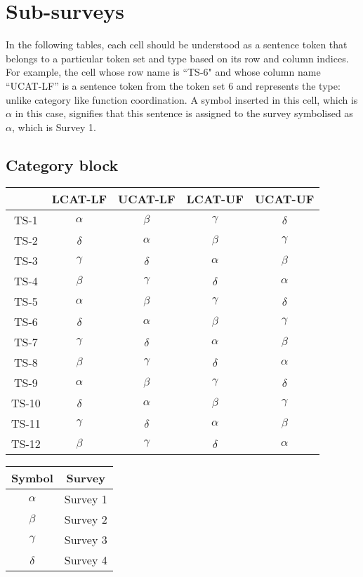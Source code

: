 \section{Sub-surveys} \label{app:subsurveys}

In the following tables, each cell should be understood as a sentence token that belongs to a particular token set and type based on its row and column indices. For example, the cell whose row name is ``TS-6" and whose column name ``UCAT-LF'' is a sentence token from the token set 6 and represents the type: unlike category like function coordination. A symbol inserted in this cell, which is $\alpha$ in this case, signifies that this sentence is assigned to the survey symbolised as $\alpha$, which is Survey 1. 

\subsection{Category block}

\begin{tabular}{|c|c|c|c|c|}
	\hline
	 & \textbf{LCAT-LF} & \textbf{UCAT-LF} & \textbf{LCAT-UF} & \textbf{UCAT-UF} \\ \hline
	TS-1 & $\alpha$ & $\beta$ & $\gamma$ & $\delta$ \\ \hline
	TS-2 & $\delta$ & $\alpha$ & $\beta$ & $\gamma$ \\ \hline
	TS-3 & $\gamma$ & $\delta$ & $\alpha$ & $\beta$ \\ \hline
	TS-4 & $\beta$ & $\gamma$ & $\delta$ & $\alpha$ \\ \hline
	TS-5 & $\alpha$ & $\beta$ & $\gamma$ & $\delta$ \\ \hline
	TS-6 & $\delta$ & $\alpha$ & $\beta$ & $\gamma$ \\ \hline
	TS-7 & $\gamma$ & $\delta$ & $\alpha$ & $\beta$ \\ \hline
	TS-8 & $\beta$ & $\gamma$ & $\delta$ & $\alpha$ \\ \hline
	TS-9 & $\alpha$ & $\beta$ & $\gamma$ & $\delta$ \\ \hline
	TS-10 & $\delta$ & $\alpha$ & $\beta$ & $\gamma$ \\ \hline
	TS-11 & $\gamma$ & $\delta$ & $\alpha$ & $\beta$ \\ \hline
	TS-12 & $\beta$ & $\gamma$ & $\delta$ & $\alpha$ \\ \hline
\end{tabular}
\quad
\begin{tabular}{|c|c|}
	\hline
	\textbf{Symbol} & \textbf{Survey} \\ \hline
	$\alpha$ & Survey 1 \\ \hline
	$\beta$ & Survey 2 \\ \hline
	$\gamma$ & Survey 3 \\ \hline
	$\delta$ & Survey 4 \\ \hline
\end{tabular}



